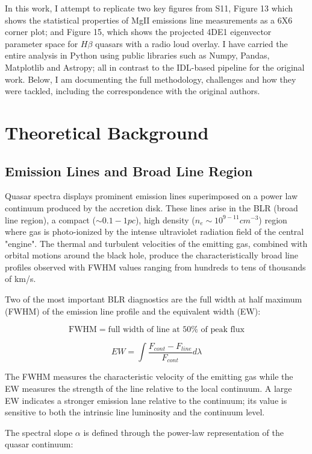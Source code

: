 \documentclass[11pt,a4paper]{article}
\begin{document}
In this work, I attempt to replicate two key figures from S11, Figure 13 which shows the statistical properties of MgII emissions line measurements as a 6X6 corner plot; and Figure 15, which shows the projected 4DE1 eigenvector parameter space for $H \beta$ quasars with a radio loud overlay. I have carried the entire analysis in Python using public libraries such as Numpy, Pandas, Matplotlib and Astropy; all in contrast to the IDL-based pipeline for the original work. Below, I am documenting the full methodology, challenges and how they were tackled, including the correspondence with the original authors. 

\section{Theoretical Background}

\subsection{Emission Lines and Broad Line Region}
Quasar spectra displays prominent emission lines superimposed on a power law continuum produced by the accretion disk. These lines arise in the BLR (broad line region), a compact ($\sim 0.1-1pc$), high density ($n_{e}\sim 10^{9-11} cm^{-3}$) region where gas is photo-ionized by the intense ultraviolet radiation field of the central "engine". The thermal and turbulent velocities of the emitting gas, combined with orbital motions around the black hole, produce the characteristically broad line profiles observed with FWHM values ranging from hundreds to tens of thousands of km/s. 

Two of the most important BLR diagnostics are the full width at half maximum (FWHM) of the emission line profile and the equivalent width (EW): 

$$\text{FWHM} = \text{full width of line at } 50\% \text{ of peak flux}$$

$$EW=\int \frac{{F_{cont}-F_{line}}}{F_{cont}}d\lambda$$

The FWHM measures the characteristic velocity of the emitting gas while the EW measures the strength of the line relative to the local continuum. A large EW indicates a stronger emission lane relative to the continuum; its value is sensitive to both the intrinsic line luminosity and the continuum level. 

The spectral slope $\alpha$ is defined through the power-law representation of the quasar continuum:
\end{document}

